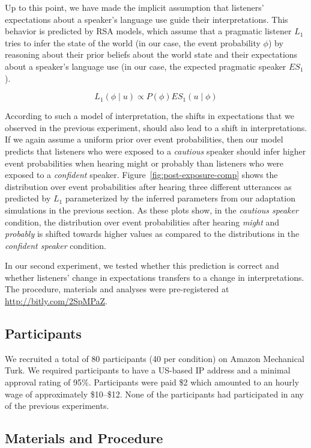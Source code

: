 \documentclass[lucida,biblatex]{sp} %
\begin{document}
Up to this point, we have made the implicit assumption that listeners' expectations about a speaker's language use guide their interpretations. This behavior is
predicted by RSA models, which assume that a pragmatic listener $L_1$ tries to infer the state of the world (in our case, the event probability $\phi$) by reasoning
about their prior beliefs about the world state and their expectations about a speaker's language use (in our case, the expected pragmatic speaker $ES_{1}$).

$$ L_1(\phi \mid u) \propto P(\phi) ES_1(u \mid \phi)$$

According to such a model of interpretation, the shifts in expectations that we observed in the previous experiment, should also lead to a shift in interpretations. 
If we again assume a uniform prior over event probabilities, then our model predicts that listeners who were exposed to a \textit{cautious} speaker should infer 
higher event probabilities when hearing {\sc might} or {\sc probably} than listeners who were exposed to a \textit{confident} speaker. Figure~\ref{fig:post-exposure-comp}
shows the distribution over event probabilities after hearing three different utterances as predicted by $L_1$ parameterized by the inferred parameters from our
adaptation simulations in the previous section. As these plots show, in the \textit{cautious speaker} condition, the distribution over event probabilities after hearing \textit{might} 
and \textit{probably} is shifted towards higher values as compared to the distributions in the \textit{confident speaker} condition. 

In our second experiment, we tested whether this prediction is correct and whether listeners' change in expectations transfers to a change in interpretations. 
The procedure, materials and analyses were pre-registered at \url{http://bitly.com/2SpMPaZ}.

\subsection{Participants}

We recruited a total of 80 participants (40 per condition) on Amazon Mechanical Turk. We required participants to have a US-based IP address and a minimal approval rating of 95\%. Participants were paid \$2 which amounted to an hourly wage of approximately \$10--\$12. None of the participants had participated in any of the previous experiments. 

\subsection{Materials and Procedure}
\end{document}

